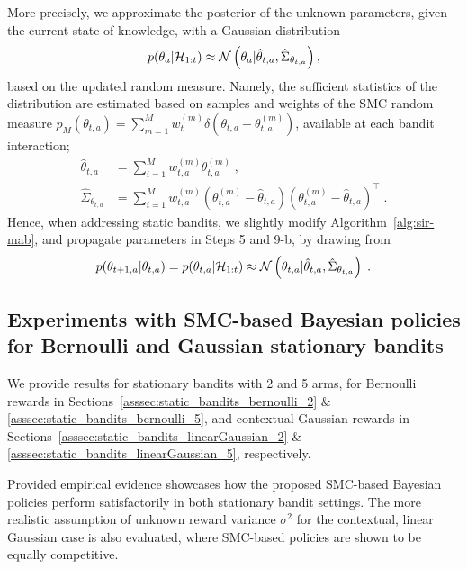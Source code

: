 More precisely,
we approximate the posterior of the unknown parameters,
given the current state of knowledge,
with a Gaussian distribution
\begin{equation}
p(\theta_a|\mathcal{H}_{1:t}) \approx \mathcal{N}\left( \theta_a|\hat{\theta}_{t,a}, \hat{\Sigma}_{\theta_{t,a}}\right),
\end{equation}
based on the updated random measure.
Namely, the sufficient statistics of the distribution 
are estimated based on samples and weights of the SMC random measure $p_M(\theta_{t,a})=\sum_{m=1}^M w_{t}^{(m)} \delta\left(\theta_{t,a}-\theta_{t,a}^{(m)}\right)$,
available at each bandit interaction; \ie
\begin{equation}
\begin{split}
\hat{\theta}_{t,a} &= \sum_{i=1}^{M} w_{t,a}^{(m)} \theta^{(m)}_{t,a} \;,  \\
\hat{\Sigma}_{\theta_{t,a}} &= \sum_{i=1}^{M} w_{t,a}^{(m)}(\theta^{(m)}_{t,a} - \hat{\theta}_{t,a})(\theta^{(m)}_{t,a} - \hat{\theta}_{t,a})^\top \;.
\end{split}
\label{eq:proposedMethod_unknownAB_DA_estSuffStatistics}
\end{equation}
Hence, when addressing static bandits,
we slightly modify Algorithm~\ref{alg:sir-mab},
and propagate parameters in Steps 5 and 9-b,
by drawing from
\begin{equation}
p(\theta_{t+1,a}|\theta_{t,a})=p(\theta_{t,a}|\mathcal{H}_{1:t}) \approx \mathcal{N}\left( \theta_{t,a}|\hat{\theta}_{t,a}, \hat{\Sigma}_{\theta_{t,a}}\right) \;.
\end{equation}

\subsection{Experiments with SMC-based Bayesian policies for Bernoulli and Gaussian stationary bandits}
\label{assec:static_bandits_experiments_analytical}

We provide results for stationary bandits with 2 and 5 arms,
for Bernoulli rewards in Sections~\ref{asssec:static_bandits_bernoulli_2} \& \ref{asssec:static_bandits_bernoulli_5},
and contextual-Gaussian rewards in Sections~\ref{asssec:static_bandits_linearGaussian_2} \& \ref{asssec:static_bandits_linearGaussian_5}, respectively.

Provided empirical evidence showcases
how the proposed SMC-based Bayesian policies perform satisfactorily in both stationary bandit settings.
The more realistic assumption of unknown reward variance $\sigma^2$ for the contextual, linear Gaussian case is also evaluated,
where SMC-based policies are shown to be equally competitive.

